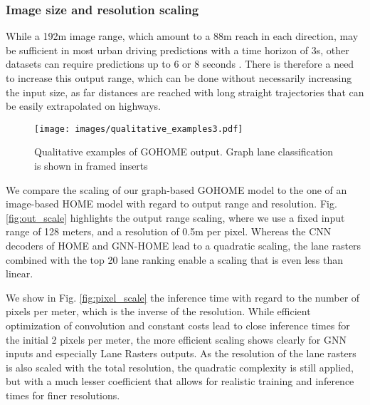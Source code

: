 \documentclass[letterpaper, 10 pt, conference]{ieeeconf}
\begin{document}
\subsubsection{Image size and resolution scaling}

While a 192m image range, which amount to a 88m reach in each direction, may be sufficient in most urban driving predictions with a time horizon of 3s, other datasets can require predictions up to 6 or 8 seconds \cite{caesar2020nuscenes,ettinger2021large}. There is therefore a need to increase this output range, which can be done without necessarily increasing the input size, as far distances are reached with long straight trajectories that can be easily extrapolated on highways. 












\begin{figure*}[b]
\centerline{\texttt{[image: images/qualitative\_examples3.pdf]}}
\caption{Qualitative examples of GOHOME output. Graph lane classification is shown in framed inserts}
\label{fig:quali}
\end{figure*}



We compare the scaling of our graph-based GOHOME model to the one of an image-based HOME model with regard to output range and resolution. Fig. \ref{fig:out_scale} highlights the output range scaling, where we use a fixed input range of 128 meters, and a resolution of 0.5m per pixel. Whereas the CNN decoders of HOME and GNN-HOME lead to a quadratic scaling, the lane rasters combined with the top 20 lane ranking enable a scaling that is even less than linear.




We show in Fig. \ref{fig:pixel_scale} the inference time with regard to the number of pixels per meter, which is the inverse of the resolution. While efficient optimization of convolution and constant costs lead to close inference times for the initial 2 pixels per meter, the more efficient scaling shows clearly for GNN inputs and especially Lane Rasters outputs. As the resolution of the lane rasters is also scaled with the total resolution, the quadratic complexity is still applied, but with a much lesser coefficient that allows for realistic training and inference times for finer resolutions.
\end{document}

